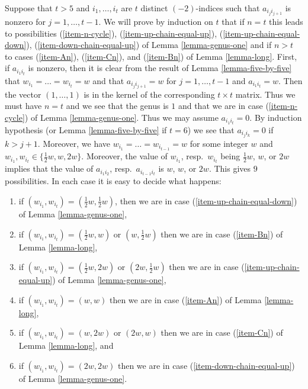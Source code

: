 \noindent
Suppose that $t > 5$ and $i_1, \ldots, i_t$ are $t$ distinct $(-2)$-indices
such that $a_{i_ji_{j + 1}}$ is nonzero for $j = 1, \ldots, t - 1$. We will
prove by induction on $t$ that if $n = t$ this leads to possibilities
(\ref{item-n-cycle}), (\ref{item-up-chain-equal-up}),
(\ref{item-up-chain-equal-down}), (\ref{item-down-chain-equal-up})
of Lemma \ref{lemma-genus-one} and if $n > t$ to cases
(\ref{item-An}), (\ref{item-Cn}), and (\ref{item-Bn}) of
Lemma \ref{lemma-long}.
First, if $a_{i_1i_t}$ is nonzero, then it is clear from
the result of Lemma \ref{lemma-five-by-five} that
$w_{i_1} = \ldots = w_{i_t} = w$ and that
$a_{i_ji_{j + 1}} = w$ for $j = 1, \ldots, t - 1$ and
$a_{i_1i_t} = w$. Then the vector $(1, \ldots, 1)$ is in the kernel
of the corresponding $t \times t$ matrix. Thus we must have $n = t$
and we see that the genus is $1$ and that we are
in case (\ref{item-n-cycle}) of Lemma \ref{lemma-genus-one}.
Thus we may assume $a_{i_1i_t} = 0$.
By induction hypothesis (or Lemma \ref{lemma-five-by-five} if $t = 6$)
we see that $a_{i_ji_k} = 0$ if $k > j + 1$.
Moreover, we have $w_{i_1} = \ldots = w_{i_{t - 1}} = w$
for some integer $w$ and $w_{i_1}, w_{i_t} \in \{\frac{1}{2}w, w, 2w\}$.
Moreover, the value of $w_{i_1}$, resp.\ $w_{i_t}$ being
$\frac{1}{2}w$, $w$, or $2w$ implies that the
value of $a_{i_1i_2}$, resp.\ $a_{i_{t - 1}i_t}$
is $w$, $w$, or $2w$. This gives $9$ possibilities.
In each case it is easy to decide what happens:
\begin{enumerate}
\item if $(w_{i_1}, w_{i_t}) = (\frac{1}{2}w, \frac{1}{2}w)$, then
we are in case (\ref{item-up-chain-equal-down}) of
Lemma \ref{lemma-genus-one},
\item if $(w_{i_1}, w_{i_t}) = (\frac{1}{2}w, w)$ or $(w, \frac{1}{2}w)$
then we are in case (\ref{item-Bn}) of Lemma \ref{lemma-long},
\item if $(w_{i_1}, w_{i_t}) = (\frac{1}{2}w, 2w)$ or $(2w, \frac{1}{2}w)$
then we are in case (\ref{item-up-chain-equal-up}) of
Lemma \ref{lemma-genus-one},
\item if $(w_{i_1}, w_{i_t}) = (w, w)$ then we are in case
(\ref{item-An}) of Lemma \ref{lemma-long},
\item if $(w_{i_1}, w_{i_t}) = (w, 2w)$ or $(2w, w)$ then we are
in case (\ref{item-Cn}) of Lemma \ref{lemma-long}, and
\item if $(w_{i_1}, w_{i_t}) = (2w, 2w)$ then we are in case
(\ref{item-down-chain-equal-up}) of Lemma \ref{lemma-genus-one}.
\end{enumerate}

